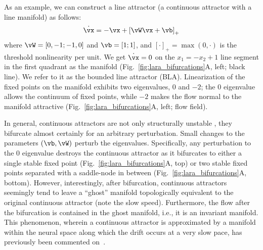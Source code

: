 \documentclass{article} %
\newcounter{ct}
\newcommand{\reals}{\mathbb{R}}
\theoremstyle{definition}
\theoremstyle{remark}
\begin{document}
As an example, we can construct a line attractor (a continuous attractor with a line manifold) as follows:
\begin{align}\label{eq:TLN}
    \dot{\vx} = -\vx + \left[ \vW \vx + \vb \right]_{+}
\end{align}
where \(\vW = [0, -1; -1, 0]\) and \(\vb = [1; 1]\), and \([\cdot]_{+} = \max(0,\cdot)\) is the threshold nonlinearity per unit.
We get \(\dot{\vx} = 0\) on the \(x_1 = -x_2 + 1\) line segment in the first quadrant as the manifold (Fig.~\ref{fig:lara_bifurcations}A, left; black line).
We refer to it as the bounded line attractor (BLA).
Linearization of the fixed points on the manifold exhibits two eigenvalues, \(0\) and \(-2\);
the \(0\) eigenvalue allows the continuum of fixed points, while \(-2\) makes the flow normal to the manifold attractive (Fig.~\ref{fig:lara_bifurcations}A, left; flow field).

In general, continuous attractors are not only structurally unstable \citep{mane1987proof}, they bifurcate almost certainly for an arbitrary perturbation.
Small changes to the parameters \((\vb,\vW)\) perturb the eigenvalues.
Specifically, any perturbation to the \(0\) eigenvalue destroys the continuous attractor as it bifurcates to either
a single stable fixed point (Fig.~\ref{fig:lara_bifurcations}A, top) or two stable fixed points separated with a saddle-node in between (Fig.~\ref{fig:lara_bifurcations}A, bottom).
However, interestingly, after bifurcation, continuous attractors seemingly tend to leave a ``ghost'' manifold topologically equivalent to the original continuous attractor (note the slow speed).
Furthermore, the flow after the bifurcation is contained in the ghost manifold, i.e., it is an invariant manifold.
This phenomenon, wherein a continuous attractor is approximated by a manifold within the neural space along which the drift occurs at a very slow pace, has previously been commented on~\citep{seung1997learning,mante2013context}.
\end{document}

